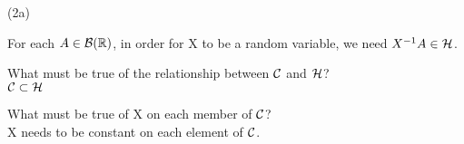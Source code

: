 (2a)

For each $ A \in \mathcal{B}(\mathbb{R}) $, in order for X to be a random variable, we need $X^{-1} A \in \mathcal{H}$.

What must be true of the relationship between $\cal{C}$ and $\mathcal{H}$?\\
$ \cal{C} \subset \mathcal{H} $

What must be true of X on each member of $\mathcal{C}$?\\
X needs to be constant on each element of $\mathcal{C}$.


